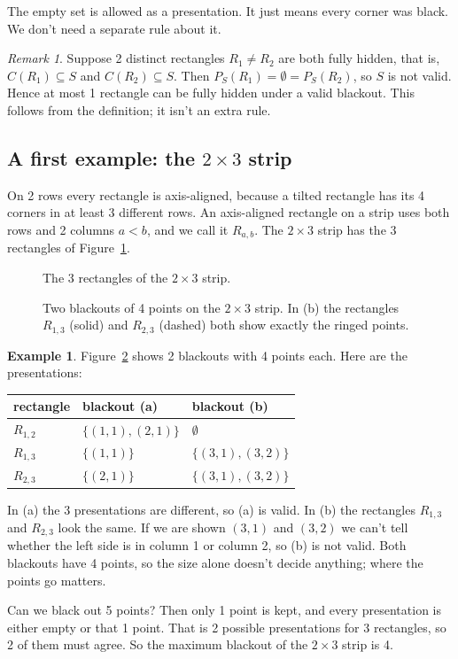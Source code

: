 \documentclass[11pt]{article}
\theoremstyle{definition}
\newtheorem{example}[theorem]{Example}
\theoremstyle{remark}
\newtheorem{remark}[theorem]{Remark}
\newcommand{\pres}{P_S}
\begin{document}
The empty set is allowed as a presentation. It just means every corner was black. We don't need
a separate rule about it.

\begin{remark}\label{rem:empty}
Suppose 2 distinct rectangles $R_1\ne R_2$ are both fully hidden, that is,
$C(R_1)\subseteq S$ and $C(R_2)\subseteq S$. Then $\pres(R_1)=\emptyset=\pres(R_2)$, so $S$ is
not valid. Hence at most 1 rectangle can be fully hidden under a valid blackout. This follows
from the definition; it isn't an extra rule.
\end{remark}

\subsection{A first example: the $2\times3$ strip}

On 2 rows every rectangle is axis-aligned, because a tilted rectangle has its 4 corners in at
least 3 different rows. An axis-aligned rectangle on a strip uses both rows and 2 columns
$a<b$, and we call it $R_{a,b}$. The $2\times3$ strip has the 3 rectangles of
Figure~\ref{fig:striprects}.

\begin{figure}[htbp]
\centering

\caption{The 3 rectangles of the $2\times3$ strip.}
\label{fig:striprects}
\end{figure}

\begin{figure}[htbp]
\centering

\caption{Two blackouts of 4 points on the $2\times3$ strip. In (b) the rectangles $R_{1,3}$
(solid) and $R_{2,3}$ (dashed) both show exactly the ringed points.}
\label{fig:twoblackouts}
\end{figure}

\begin{example}\label{ex:2x3}
Figure~\ref{fig:twoblackouts} shows 2 blackouts with 4 points each. Here are the presentations:
\begin{center}
\begin{tabular}{lll}
\toprule
rectangle & blackout (a) & blackout (b)\\
\midrule
$R_{1,2}$ & $\{(1,1),(2,1)\}$ & $\emptyset$ \\
$R_{1,3}$ & $\{(1,1)\}$ & $\{(3,1),(3,2)\}$ \\
$R_{2,3}$ & $\{(2,1)\}$ & $\{(3,1),(3,2)\}$ \\
\bottomrule
\end{tabular}
\end{center}
In (a) the 3 presentations are different, so (a) is valid. In (b) the rectangles $R_{1,3}$ and
$R_{2,3}$ look the same. If we are shown $(3,1)$ and $(3,2)$ we can't tell whether the left side
is in column 1 or column 2, so (b) is not valid. Both blackouts have 4 points, so the size alone
doesn't decide anything; where the points go matters.

Can we black out 5 points? Then only 1 point is kept, and every presentation is either empty or
that 1 point. That is 2 possible presentations for 3 rectangles, so 2 of them must agree. So the
maximum blackout of the $2\times3$ strip is 4.
\end{example}
\end{document}
